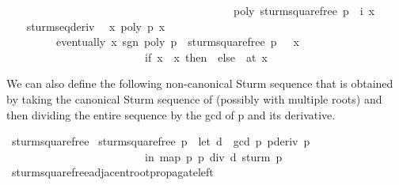 \begin{isabellebody}
\ \ \ \ \ \ \ \ \ \ \ \ \ \ \ \ \ \ \ \ \ \ \ \ \ \ \ \ \ \ \ \ \ \ \ \ \ \ \ \ \ poly\ {\isacharparenleft}sturm{\isacharunderscore}squarefree\ p\ {\isacharbang}\ i{\isacharparenright}\ x\ {\isacharless}\ {}{\isachardoublequoteclose}\ \isacommand{{\isachardot}}\isamarkupfalse%
\isanewline
\isanewline
\ \ \isamarkupfalse%
\ sturm{\isacharunderscore}seq{\isachardot}deriv\ \isamarkupfalse%
\ {\isachardoublequoteopen}{\isasymAnd}x\ poly\ p{\isacharprime}\ x\ {\isacharequal}\ {}\ {\isasymLongrightarrow}\isanewline
\ \ \ \ \ \ \ \ \ eventually\ {\isacharparenleft}{\isasymlambda}x{\isachardot}\ sgn\ {\isacharparenleft}poly\ {\isacharparenleft}p{\isacharprime}\ {\isacharasterisk}\ sturm{\isacharunderscore}squarefree\ p\ {\isacharbang}\ {}{\isacharparenright}\ x{\isacharparenright}\ {\isacharequal}\isanewline
\ \ \ \ \ \ \ \ \ \ \ \ \ \ \ \ \ \ \ \ \ \ \ \ \ {\isacharparenleft}if\ x\ {\isachargreater}\ x\ then\ {}\ else\ {\isacharminus}{}{\isacharparenright}{\isacharparenright}\ {\isacharparenleft}at\ x\ \isacommand{{\isachardot}}\isamarkupfalse%
\isanewline
{}\isamarkupfalse%
%
\endisatagproof
{\isafoldproof}%
%
\isadelimproof
%
\endisadelimproof
%
\isamarkuptrue%
%
\begin{isamarkuptext}%
We can also define the following non-canonical Sturm sequence that 
  is obtained by taking the canonical Sturm sequence of 
  (possibly with multiple roots) and then dividing the entire 
  sequence by the gcd of p and its derivative.%
\end{isamarkuptext}%
\isamarkuptrue%
\isamarkupfalse%
\ sturm{\isacharunderscore}squarefree{\isacharprime}\ \isanewline
{\isachardoublequoteopen}sturm{\isacharunderscore}squarefree{\isacharprime}\ p\ {\isacharequal}\ {\isacharparenleft}let\ d\ {\isacharequal}\ gcd\ p\ {\isacharparenleft}pderiv\ p{\isacharparenright}\isanewline
\ \ \ \ \ \ \ \ \ \ \ \ \ \ \ \ \ \ \ \ \ \ \ \ \ in\ map\ {\isacharparenleft}{\isasymlambda}p{\isacharprime}{\isachardot}\ p{\isacharprime}\ div\ d{\isacharparenright}\ {\isacharparenleft}sturm\ p{\isacharparenright}{\isacharparenright}{\isachardoublequoteclose}\isanewline
\isanewline
{}\isamarkupfalse%
\ sturm{\isacharunderscore}squarefree{\isacharprime}{\isacharunderscore}adjacent{\isacharunderscore}root{\isacharunderscore}propagate{\isacharunderscore}left{\isacharcolon}\isanewline

\end{isabellebody}
